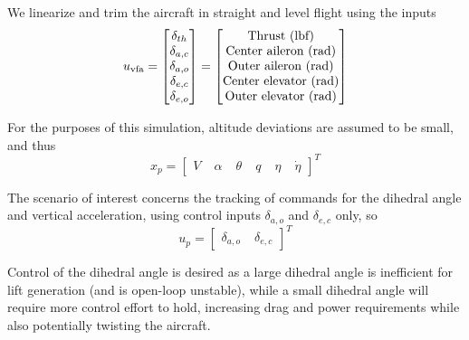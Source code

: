 \documentclass[english]{ifacconf}
\begin{document}
We linearize and trim the aircraft in straight and level flight using the inputs
\begin{equation}
	u_{\text{vfa}} = \begin{bmatrix}
\delta_{th} \\
\delta_{a,c} \\
\delta_{a,o} \\
\delta_{e,c} \\
\delta_{e,o} 
\end{bmatrix} = \begin{bmatrix}
		$Thrust (lbf)$\\
		$Center aileron (rad)$\\
		$Outer aileron (rad)$\\
		$Center elevator (rad)$\\
		$Outer elevator (rad)$
	\end{bmatrix}
\end{equation}

For the purposes of this simulation, altitude deviations are assumed to be small, and thus
\begin{equation}
	x_p = \begin{bmatrix}
V & \; \alpha & \; \theta & \; q & \; \eta & \; \dot{\eta}
\end{bmatrix}^T
\end{equation}

The scenario of interest concerns the tracking of commands for the dihedral angle and vertical acceleration, using control inputs $\delta_{a,o}$ and $\delta_{e,c}$ only, so
\begin{equation}
	u_p = \begin{bmatrix}
\delta_{a,o} & \; \delta_{e,c}
\end{bmatrix}^T
\end{equation}

Control of the dihedral angle is desired as a large dihedral angle is inefficient for lift generation (and is open-loop unstable), while a small dihedral angle will require more control effort to hold, increasing drag and power requirements while also potentially twisting the aircraft. 
\end{document}
